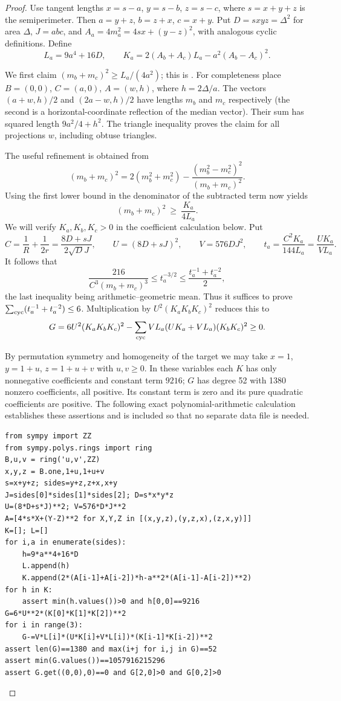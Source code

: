 \documentclass[11pt,a4paper]{article}
\numberwithin{equation}{section}
\theoremstyle{definition}
\theoremstyle{remark}
\begin{document}
\begin{proof}
Use tangent lengths $x=s-a$, $y=s-b$, $z=s-c$, where $s=x+y+z$ is the semiperimeter. Then $a=y+z$, $b=z+x$, $c=x+y$. Put $D=sxyz=\Delta^2$ for area $\Delta$, $J=abc$, and $A_a=4m_a^2=4sx+(y-z)^2$, with analogous cyclic definitions. Define
\[
 L_a=9a^4+16D,\qquad K_a=2(A_b+A_c)L_a-a^2(A_b-A_c)^2 .
\]

We first claim $(m_b+m_c)^2\ge L_a/(4a^2)$; this is \cite[Lemma 2.3]{r36reiwa:liu}. For completeness place $B=(0,0)$, $C=(a,0)$, $A=(w,h)$, where $h=2\Delta/a$. The vectors $(a+w,h)/2$ and $(2a-w,h)/2$ have lengths $m_b$ and $m_c$ respectively (the second is a horizontal-coordinate reflection of the median vector). Their sum has squared length $9a^2/4+h^2$. The triangle inequality proves the claim for all projections $w$, including obtuse triangles.

The useful refinement is obtained from
\[
 (m_b+m_c)^2=2(m_b^2+m_c^2)-\frac{(m_b^2-m_c^2)^2}{(m_b+m_c)^2}.
\]
Using the first lower bound in the denominator of the subtracted term now yields
\[
 (m_b+m_c)^2\ \ge\ \frac{K_a}{4L_a}.
\]
We will verify $K_a,K_b,K_c>0$ in the coefficient calculation below. Put
\[
 C=\frac1R+\frac1{2r}=\frac{8D+sJ}{2\sqrt D J},\qquad
 U=(8D+sJ)^2,\qquad V=576DJ^2,\qquad
 t_a=\frac{C^2K_a}{144L_a}=\frac{UK_a}{VL_a}.
\]
It follows that
\[
 \frac{216}{C^3(m_b+m_c)^3}\le t_a^{-3/2}
 \le \frac{t_a^{-1}+t_a^{-2}}{2},
\]
the last inequality being arithmetic--geometric mean. Thus it suffices to prove $\sum_{\rm cyc}(t_a^{-1}+t_a^{-2})\le6$. Multiplication by $U^2(K_aK_bK_c)^2$ reduces this to
\begin{equation}\label{r36reiwa:poly}
 G=6U^2(K_aK_bK_c)^2-
 \sum_{\rm cyc}VL_a(UK_a+VL_a)(K_bK_c)^2\ge0.
\end{equation}

By permutation symmetry and homogeneity of the target we may take $x=1$, $y=1+u$, $z=1+u+v$ with $u,v\ge0$. In these variables each $K$ has only nonnegative coefficients and constant term $9216$; $G$ has degree 52 with 1380 nonzero coefficients, all positive. Its constant term is zero and its pure quadratic coefficients are positive. The following exact polynomial-arithmetic calculation establishes these assertions and is included so that no separate data file is needed.
\begin{small}
\begin{Verbatim}
from sympy import ZZ
from sympy.polys.rings import ring
B,u,v = ring('u,v',ZZ)
x,y,z = B.one,1+u,1+u+v
s=x+y+z; sides=y+z,z+x,x+y
J=sides[0]*sides[1]*sides[2]; D=s*x*y*z
U=(8*D+s*J)**2; V=576*D*J**2
A=[4*s*X+(Y-Z)**2 for X,Y,Z in [(x,y,z),(y,z,x),(z,x,y)]]
K=[]; L=[]
for i,a in enumerate(sides):
    h=9*a**4+16*D
    L.append(h)
    K.append(2*(A[i-1]+A[i-2])*h-a**2*(A[i-1]-A[i-2])**2)
for h in K:
    assert min(h.values())>0 and h[0,0]==9216
G=6*U**2*(K[0]*K[1]*K[2])**2
for i in range(3):
    G-=V*L[i]*(U*K[i]+V*L[i])*(K[i-1]*K[i-2])**2
assert len(G)==1380 and max(i+j for i,j in G)==52
assert min(G.values())==1057916215296
assert G.get((0,0),0)==0 and G[2,0]>0 and G[0,2]>0
\end{Verbatim}


\end{small}
\end{proof}
\end{document}
